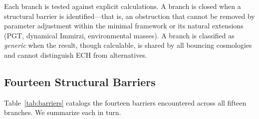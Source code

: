 Each branch is tested against explicit calculations.  A branch is closed when
a structural barrier is identified---that is, an obstruction that cannot be
removed by parameter adjustment within the minimal framework or its natural
extensions (PGT, dynamical Immirzi, environmental masses).  A branch is
classified as \emph{generic} when the result, though calculable, is shared by
all bouncing cosmologies and cannot distinguish ECH from alternatives.


\subsection{Fourteen Structural Barriers}
\label{sec:barriers}

Table~\ref{tab:barriers} catalogs the fourteen barriers encountered across
all fifteen branches.  We summarize each in turn.

